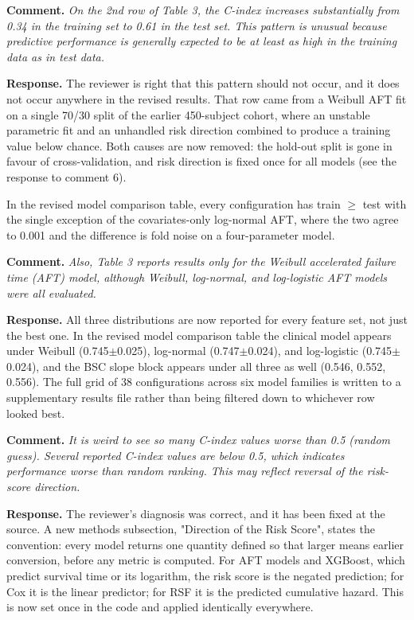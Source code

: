 \documentclass[11pt]{article}
\newcommand{\comment}[1]{\vspace{6pt}\noindent\textbf{Comment.} \textit{#1}\par\vspace{2pt}}
\newcommand{\response}{\noindent\textbf{Response.} }
\begin{document}
\comment{On the 2nd row of Table 3, the C-index increases substantially from 0.34 in the training set to 0.61 in the test set. This pattern is unusual because predictive performance is generally expected to be at least as high in the training data as in test data.}

\response The reviewer is right that this pattern should not occur, and it does not occur anywhere in the revised results. That row came from a Weibull AFT fit on a single 70/30 split of the earlier 450-subject cohort, where an unstable parametric fit and an unhandled risk direction combined to produce a training value below chance. Both causes are now removed: the hold-out split is gone in favour of cross-validation, and risk direction is fixed once for all models (see the response to comment 6).

In the revised model comparison table, every configuration has train $\geq$ test with the single exception of the covariates-only log-normal AFT, where the two agree to 0.001 and the difference is fold noise on a four-parameter model.

\comment{Also, Table 3 reports results only for the Weibull accelerated failure time (AFT) model, although Weibull, log-normal, and log-logistic AFT models were all evaluated.}

\response All three distributions are now reported for every feature set, not just the best one. In the revised model comparison table the clinical model appears under Weibull (0.745$\pm$0.025), log-normal (0.747$\pm$0.024), and log-logistic (0.745$\pm$0.024), and the BSC slope block appears under all three as well (0.546, 0.552, 0.556). The full grid of 38 configurations across six model families is written to a supplementary results file rather than being filtered down to whichever row looked best.

\comment{It is weird to see so many C-index values worse than 0.5 (random guess). Several reported C-index values are below 0.5, which indicates performance worse than random ranking. This may reflect reversal of the risk-score direction.}

\response The reviewer's diagnosis was correct, and it has been fixed at the source. A new methods subsection, "Direction of the Risk Score", states the convention: every model returns one quantity defined so that larger means earlier conversion, before any metric is computed. For AFT models and XGBoost, which predict survival time or its logarithm, the risk score is the negated prediction; for Cox it is the linear predictor; for RSF it is the predicted cumulative hazard. This is now set once in the code and applied identically everywhere.
\end{document}
